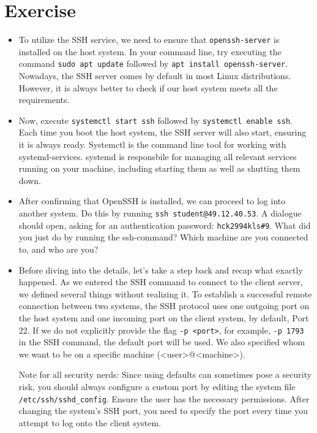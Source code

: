 \documentclass{dcbl/challenge}
\begin{document}
\section*{Exercise}
\begin{aufgabe}
\begin{itemize}
    \item To utilize the SSH service, we need to ensure that \texttt{openssh-server} is installed on the host system. In your command line, try executing the command \texttt{sudo apt update} followed by \texttt{apt install openssh-server}. Nowadays, the SSH server comes by default in most Linux distributions. However, it is always better to check if our host system meets all the requirements.

    \item Now, execute \texttt{systemctl start ssh} followed by \texttt{systemctl enable ssh}. Each time you boot the host system, the SSH server will also start, ensuring it is always ready. Systemctl is the command line tool for working with systemd-services. systemd is responsbile for managing all relevant services running on your machine, including starting them as well as shutting them down.

    \item After confirming that OpenSSH is installed, we can proceed to log into another system. Do this by running \texttt{ssh student@49.12.40.53}. A dialogue should open, asking for an authentication password: \texttt{hck2994kls\#9}. What did you just do by running the ssh-command? Which machine are you connected to, and who are you?
    
    \item Before diving into the details, let's take a step back and recap what exactly happened. As we entered the SSH command to connect to the client server, we defined several things without realizing it. To establish a successful remote connection between two systems, the SSH protocol uses one outgoing port on the host system and one incoming port on the client system, by default, Port 22. If we do not explicitly provide the flag \texttt{-p <port>}, for example, \texttt{-p 1793} in the SSH command, the default port will be used. We also specified whom we want to be on a specific machine (<user>@<machine>).

    Note for all security nerds:
    Since using defaults can sometimes pose a security risk, you should always configure a custom port by editing the system file \texttt{/etc/ssh/sshd\_config}. Ensure the user has the necessary permissions. After changing the system's SSH port, you need to specify the port every time you attempt to log onto the client system.


\end{itemize}
\end{aufgabe}
\end{document}
